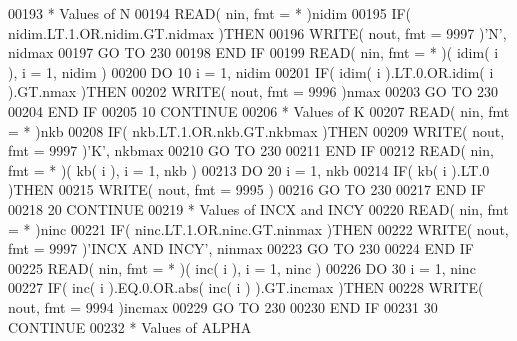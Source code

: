 \begin{DoxyCode}
00193 \textcolor{comment}{*     Values of N}
00194       \textcolor{keyword}{READ}( nin, fmt = * )nidim
00195       \textcolor{keywordflow}{IF}( nidim.LT.1.OR.nidim.GT.nidmax )\textcolor{keywordflow}{THEN}
00196          \textcolor{keyword}{WRITE}( nout, fmt = 9997 )\textcolor{stringliteral}{'N'}, nidmax
00197          \textcolor{keywordflow}{GO TO} 230
00198 \textcolor{keywordflow}{      END IF}
00199       \textcolor{keyword}{READ}( nin, fmt = * )( idim( i ), i = 1, nidim )
00200       \textcolor{keywordflow}{DO} 10 i = 1, nidim
00201          \textcolor{keywordflow}{IF}( idim( i ).LT.0.OR.idim( i ).GT.nmax )\textcolor{keywordflow}{THEN}
00202             \textcolor{keyword}{WRITE}( nout, fmt = 9996 )nmax
00203             \textcolor{keywordflow}{GO TO} 230
00204 \textcolor{keywordflow}{         END IF}
00205    10 \textcolor{keywordflow}{CONTINUE}
00206 \textcolor{comment}{*     Values of K}
00207       \textcolor{keyword}{READ}( nin, fmt = * )nkb
00208       \textcolor{keywordflow}{IF}( nkb.LT.1.OR.nkb.GT.nkbmax )\textcolor{keywordflow}{THEN}
00209          \textcolor{keyword}{WRITE}( nout, fmt = 9997 )\textcolor{stringliteral}{'K'}, nkbmax
00210          \textcolor{keywordflow}{GO TO} 230
00211 \textcolor{keywordflow}{      END IF}
00212       \textcolor{keyword}{READ}( nin, fmt = * )( kb( i ), i = 1, nkb )
00213       \textcolor{keywordflow}{DO} 20 i = 1, nkb
00214          \textcolor{keywordflow}{IF}( kb( i ).LT.0 )\textcolor{keywordflow}{THEN}
00215             \textcolor{keyword}{WRITE}( nout, fmt = 9995 )
00216             \textcolor{keywordflow}{GO TO} 230
00217 \textcolor{keywordflow}{         END IF}
00218    20 \textcolor{keywordflow}{CONTINUE}
00219 \textcolor{comment}{*     Values of INCX and INCY}
00220       \textcolor{keyword}{READ}( nin, fmt = * )ninc
00221       \textcolor{keywordflow}{IF}( ninc.LT.1.OR.ninc.GT.ninmax )\textcolor{keywordflow}{THEN}
00222          \textcolor{keyword}{WRITE}( nout, fmt = 9997 )\textcolor{stringliteral}{'INCX AND INCY'}, ninmax
00223          \textcolor{keywordflow}{GO TO} 230
00224 \textcolor{keywordflow}{      END IF}
00225       \textcolor{keyword}{READ}( nin, fmt = * )( inc( i ), i = 1, ninc )
00226       \textcolor{keywordflow}{DO} 30 i = 1, ninc
00227          \textcolor{keywordflow}{IF}( inc( i ).EQ.0.OR.abs( inc( i ) ).GT.incmax )\textcolor{keywordflow}{THEN}
00228             \textcolor{keyword}{WRITE}( nout, fmt = 9994 )incmax
00229             \textcolor{keywordflow}{GO TO} 230
00230 \textcolor{keywordflow}{         END IF}
00231    30 \textcolor{keywordflow}{CONTINUE}
00232 \textcolor{comment}{*     Values of ALPHA}

\end{DoxyCode}
